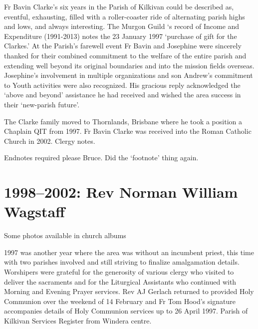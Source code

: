 Fr Bavin Clarke's six years in the Parish of Kilkivan could be described as, eventful, exhausting, filled with a roller-coaster ride of alternating parish highs and lows, and always interesting. The Murgon Guild `s record of Income and Expenditure (1991-2013) notes the 23 January 1997 `purchase of gift for the Clarkes.' At the Parish's farewell event Fr Bavin and Josephine were sincerely thanked for their combined commitment to the welfare of the entire parish and extending well beyond its original boundaries and into the mission fields overseas. Josephine's involvement in multiple organizations and son Andrew's commitment to Youth activities were also recognized. His gracious reply acknowledged the `above and beyond' assistance he had received and wished the area success in their `new-parish future'.

The Clarke family moved to Thornlands, Brisbane where he took a position a Chaplain QIT from 1997. Fr Bavin Clarke was received into the Roman Catholic Church in 2002. Clergy notes.

Endnotes required please Bruce. Did the `footnote' thing again.

\hypertarget{rev-norman-william-wagstaff}{%
\section{1998--2002: Rev Norman William Wagstaff}\label{rev-norman-william-wagstaff}}

Some photos available in church albums

1997 was another year where the area was without an incumbent priest, this time with two parishes involved and still striving to finalize amalgamation details. Worshipers were grateful for the generosity of various clergy who visited to deliver the sacraments and for the Liturgical Assistants who continued with Morning and Evening Prayer services. Rev AJ Gerlach returned to provided Holy Communion over the weekend of 14 February and Fr Tom Hood's signature accompanies details of Holy Communion services up to 26 April 1997. Parish of Kilkivan Services Register from Windera centre.

